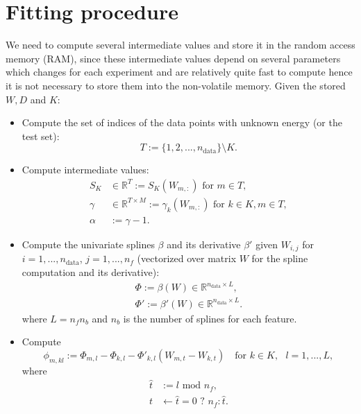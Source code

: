 \documentclass[12pt]{article}
\begin{document}
\section{Fitting procedure}
We need to compute several intermediate values and store it in the random access memory (RAM), since these intermediate values depend on several parameters which changes for each experiment and are relatively quite fast to compute hence it is not necessary to store them into the non-volatile memory. Given the stored $W, D$ and $K$:
\begin{itemize}
	\item Compute the set of indices of the data points with unknown energy (or the test set):
	\begin{equation}
		T := \{1,2,...,n_\text{data}\} \setminus K.
	\end{equation}
	\item Compute intermediate values:
	\begin{equation}
		\begin{split}
			S_K &\in \mathbb{R}^{T} := S_K(W_{m,:}) \text{ for } m \in T,\\
			\gamma &\in \mathbb{R}^{T \times M} := \gamma_k(W_{m,:}) \text{ for } k \in K, m \in T, \\
			\alpha &:= \gamma - 1.
		\end{split}
	\end{equation}
	\item Compute the univariate splines $\beta$ and its derivative $\beta'$ given $W_{i,j}$ for $i = 1,...,n_\text{data}$, $j = 1,...,n_f$ (vectorized over matrix $W$ for the spline computation and its derivative):
	\begin{equation}
		\begin{split}
			\Phi := \beta(W) \in \mathbb{R}^{n_\text{data} \times L}, \\
			\Phi' := \beta'(W) \in \mathbb{R}^{n_\text{data} \times L}.
		\end{split}
	\end{equation}
	where $L = n_fn_b$ and $n_b$ is the number of splines for each feature.
	\item Compute
	\begin{equation} %
		\phi_{m, kl} := \Phi_{m,l} - \Phi_{k,l} - \Phi'_{k,l}(W_{m,t}-W_{k,t}) \quad \text{for } k \in K, \text{ }l = 1,...,L,
	\end{equation}
	where
	\begin{equation}
		\begin{split}
			\hat{t} &:= l \text{ mod } n_f, \\
			t &\leftarrow \hat{t} = 0 \text{ ? } n_f : \hat{t}.
		\end{split}
	\end{equation} 
\end{itemize}
\end{document}

